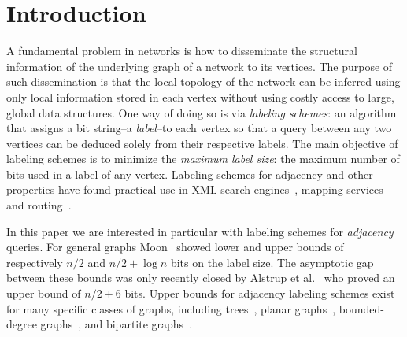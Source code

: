 

\section{Introduction}
A fundamental problem in networks is how to disseminate the structural information of the underlying graph of a network to its vertices. The purpose of such dissemination is that the local topology of the network can be inferred using only local information stored in each vertex without using costly access to large, global data structures.
One way of doing so is via  \emph{ labeling schemes}: an algorithm that assigns a bit string--a \emph{label}--to each vertex so that a query between any two vertices can be deduced solely from their respective labels. 
The main objective of  labeling schemes is to minimize the \emph{maximum label size}: the maximum number of bits used in a label of any vertex. 
Labeling schemes for adjacency and other properties have found practical use in  XML search engines~\cite{cohen2010labeling}, mapping services~\cite{abraham2011hub} and routing~\cite{krioukov2004compact}.

In this paper we are interested in particular with labeling schemes for   \emph{adjacency} queries. 
For general graphs Moon~\cite{moon1965minimal} showed lower and upper bounds of respectively $n/2$ and $n/2+\log n$ bits on the  label size.
The asymptotic gap between these bounds was only recently closed  by Alstrup et al.~\cite{alstrup2014adjacency} who proved an upper bound of $n/2 + 6$ bits. 
Upper bounds for adjacency labeling schemes exist for many specific classes of graphs, including trees~\cite{Alstrup02}, planar graphs~\cite{gavoille2007shorter},  bounded-degree graphs~\cite{adjiashvili2014labeling}, and bipartite graphs~\cite{lozin2007minimal}.

